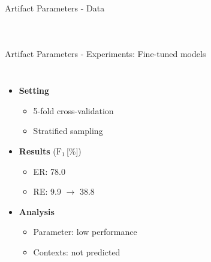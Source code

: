 \documentclass[en,16:9,smallfoot]{sdqbeamer}
\begin{document}
\begin{frame}{Artifact Parameters - Data}
\begin{columns}
{        }
   \end{columns}
   \end{frame}

   \begin{frame}{Artifact Parameters - Experiments: Fine-tuned models}
   \begin{columns}
           \begin{itemize}
               \item \textbf{Setting}
               \begin{itemize}
                   \item 5-fold cross-validation
                   \item Stratified sampling
               \end{itemize}
               \item \textbf{Results} ($\text{F}_1$\,[\%])
               \begin{itemize}
                  \item ER: 78.0
                  \item RE: 9.9 $\rightarrow$ 38.8
               \end{itemize}
               \item \textbf{Analysis}
               \begin{itemize}
                  \item Parameter: low performance
                  \item Contexts: not predicted\\~\\~\\~
               \end{itemize}
           \end{itemize}
        \begin{overlayarea}{\textwidth}{7cm}

\end{overlayarea}
\end{columns}
\end{frame}
\end{document}
